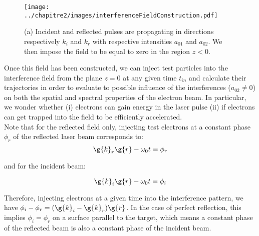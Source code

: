 \begin{figure}[H]
\begin{center}
\texttt{[image: ../chapitre2/images/interferenceFieldConstruction.pdf]}
\caption{\label{fig:interferenceFieldConstruction} (a) Incident and reflected pulses are propagating in directions respectively $k_i$ and $k_r$ with respective intensities $a_{01}$ and $a_{02}$. We then impose the field to be equal to zero in the region $z < 0$.}
\end{center}
\end{figure}
%

\noindent Once this field has been constructed, we can inject test particles into the interference field from the plane $z=0$ at any given time $t_{in}$ and calculate their trajectories in order to evaluate to possible influence of the interferences ($a_{02}\ne 0$) on both the spatial and spectral properties of the electron beam. In particular, we wonder whether (i) electrons can gain energy in the laser pulse (ii) if electrons can get trapped into the field to be efficiently accelerated.\\

\noindent Note that for the reflected field only, injecting test electrons at a constant phase $\phi_r$ of the reflected laser beam corresponds to:
$$
\g{k}_r\g{r} - \omega_0 t = \phi_r
$$

\noindent and for the incident beam:

$$
\g{k}_i\g{r} - \omega_0 t =\phi_i
$$

\noindent Therefore, injecting electrons at a given time into the interference pattern, we have $\phi_i  - \phi_r = (\g{k}_i - \g{k}_r)\g{r}$. In the case of perfect reflection, this implies $\phi_i = \phi_r$ on a surface parallel to the target, which means a constant phase of the reflected beam is also a constant phase of the incident beam.


